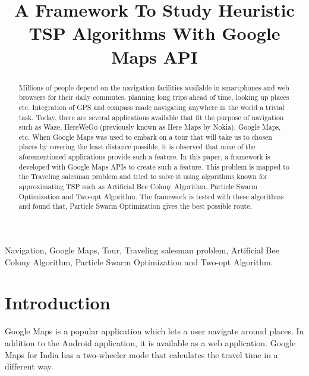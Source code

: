\documentclass[conference]{IEEEtran}
\begin{document}
\renewcommand\IEEEkeywordsname{Keywords:}

\title{A Framework To Study Heuristic TSP Algorithms With Google Maps API}

\author{
}
\maketitle

\begin{abstract}
Millions of people depend on the navigation facilities available in smartphones and web browsers for their daily commutes, planning long trips ahead of time, looking up places etc. Integration of GPS and compass made navigating anywhere in the world a trivial task. Today, there are several applications available that fit the purpose of navigation such as Waze, HereWeGo (previously known as Here Maps by Nokia), Google Maps, etc. When Google Maps was used to embark on a tour that will take us to chosen places by covering the least distance possible, it is observed that none of the aforementioned applications provide such a feature. In this paper, a framework is developed with Google Maps APIs to create such a feature. This problem is mapped to the Traveling salesman problem and tried to solve it using algorithms known for approximating TSP such as Artificial Bee Colony Algorithm, Particle Swarm Optimization and Two-opt Algorithm. The framework is tested with these algorithms and found that, Particle Swarm Optimization gives the best possible route.

\end{abstract}

\begin{IEEEkeywords}
Navigation, Google Maps, Tour, Traveling salesman problem, Artificial Bee Colony Algorithm, Particle Swarm Optimization and Two-opt Algorithm.
\end{IEEEkeywords}

\section{Introduction}
Google Maps is a popular application which lets a user navigate around places. In addition to the Android application, it is available as a web application. Google Maps for India has a two-wheeler mode that calculates the travel time in a different way. 
\end{document}
